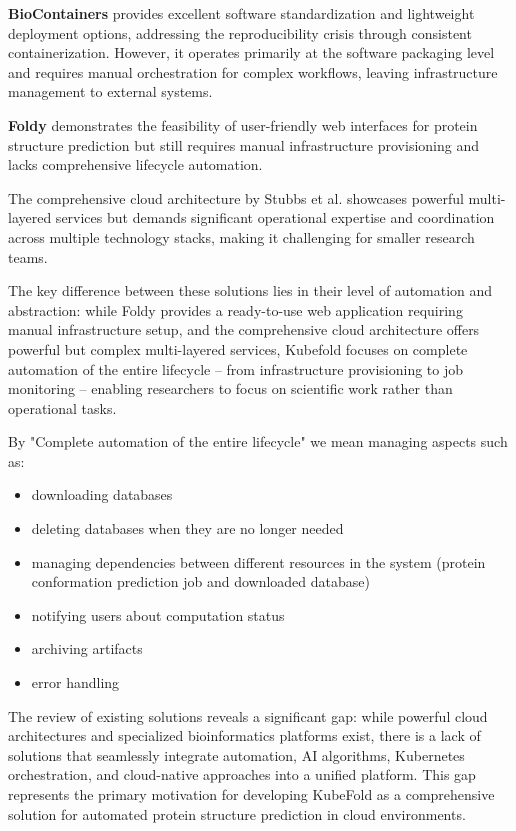 \textbf{BioContainers} provides excellent software standardization and lightweight deployment options, addressing the reproducibility crisis through consistent containerization.
However, it operates primarily at the software packaging level and requires manual orchestration for complex workflows, leaving infrastructure management to external systems.

\textbf{Foldy} demonstrates the feasibility of user-friendly web interfaces for protein structure prediction but still requires manual infrastructure provisioning and lacks comprehensive lifecycle automation.

The comprehensive cloud architecture by Stubbs et al. showcases powerful multi-layered services but demands significant operational expertise and coordination across multiple technology stacks, making it challenging for smaller research teams.

The key difference between these solutions lies in their level of automation and abstraction: while Foldy provides a ready-to-use web application requiring manual infrastructure setup, and the comprehensive cloud architecture offers powerful but complex multi-layered services, Kubefold focuses on complete automation of the entire lifecycle -- from infrastructure provisioning to job monitoring -- enabling researchers to focus on scientific work rather than operational tasks.

By "Complete automation of the entire lifecycle" we mean managing aspects such as:
\begin{itemize}
  \item downloading databases
  \item deleting databases when they are no longer needed
  \item managing dependencies between different resources in the system (protein conformation prediction job and downloaded database)
  \item notifying users about computation status
  \item archiving artifacts
  \item error handling
\end{itemize} 

The review of existing solutions reveals a significant gap: while powerful cloud architectures and specialized bioinformatics platforms exist, there is a lack of solutions that seamlessly integrate automation, AI algorithms, Kubernetes orchestration, and cloud-native approaches into a unified platform.
This gap represents the primary motivation for developing KubeFold as a comprehensive solution for automated protein structure prediction in cloud environments.
